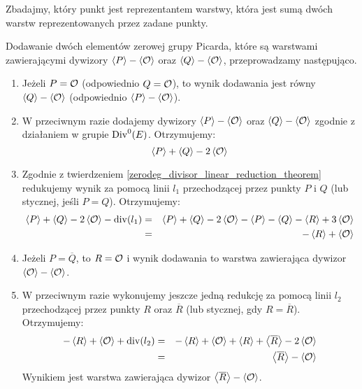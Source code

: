 Zbadajmy, który punkt jest reprezentantem warstwy,
która jest sumą dwóch warstw reprezentowanych przez zadane punkty.

\begin{fact}\label{piczero_addition_fact}
Dodawanie dwóch elementów zerowej grupy Picarda,
które są warstwami zawierającymi dywizory
$\left\langle P\right\rangle - \left\langle\mathcal{O}\right\rangle$ oraz $\left\langle Q\right\rangle - \left\langle\mathcal{O}\right\rangle$,
przeprowadzamy następująco.
\begin{enumerate}
\item
Jeżeli $P = \mathcal{O}$ (odpowiednio $Q = \mathcal{O}$),
to wynik dodawania jest równy
$\left\langle Q\right\rangle - \left\langle\mathcal{O}\right\rangle$ (odpowiednio $\left\langle P\right\rangle - \left\langle\mathcal{O}\right\rangle$).
\item
W przeciwnym razie dodajemy dywizory
$\left\langle P\right\rangle - \left\langle\mathcal{O}\right\rangle$ oraz $\left\langle Q\right\rangle - \left\langle\mathcal{O}\right\rangle$
zgodnie z działaniem w grupie $\operatorname{Div}^0(E)$.
Otrzymujemy:
\begin{equation*}
\left\langle P\right\rangle + \left\langle Q\right\rangle - 2\left\langle\mathcal{O}\right\rangle
\end{equation*}
\item
Zgodnie z twierdzeniem \ref{zerodeg_divisor_linear_reduction_theorem}
redukujemy wynik za pomocą linii $l_1$ przechodzącej przez punkty $P$ i $Q$
(lub stycznej, jeśli $P = Q$).
Otrzymujemy:
\begin{eqnarray*}
\left\langle P\right\rangle + \left\langle Q\right\rangle - 2\left\langle\mathcal{O}\right\rangle - \operatorname{div}(l_1)
& = & \left\langle P\right\rangle + \left\langle Q\right\rangle - 2\left\langle\mathcal{O}\right\rangle
- \left\langle P\right\rangle - \left\langle Q\right\rangle - \left\langle R\right\rangle + 3\left\langle\mathcal{O}\right\rangle
\\ & = &
-\left\langle R\right\rangle + \left\langle\mathcal{O}\right\rangle
\end{eqnarray*}
\item
Jeżeli $P = \overline{Q}$,
to $R = \mathcal{O}$
i wynik dodawania to warstwa
zawierająca dywizor $\left\langle\mathcal{O}\right\rangle - \left\langle\mathcal{O}\right\rangle$.
\item
W przeciwnym razie wykonujemy jeszcze jedną redukcję za pomocą linii $l_2$
przechodzącej przez punkty $R$ oraz $\overline{R}$
(lub stycznej, gdy $R = \overline{R}$).
Otrzymujemy:
\begin{eqnarray*}
-\left\langle R\right\rangle + \left\langle\mathcal{O}\right\rangle + \operatorname{div}(l_2)
& = & -\left\langle R\right\rangle + \left\langle\mathcal{O}\right\rangle
+ \left\langle R\right\rangle + \left\langle\overline{R}\right\rangle - 2\left\langle\mathcal{O}\right\rangle
\\ & = &
\left\langle\overline{R}\right\rangle - \left\langle\mathcal{O}\right\rangle
\end{eqnarray*}
Wynikiem jest warstwa
zawierająca dywizor $\left\langle\overline{R}\right\rangle - \left\langle\mathcal{O}\right\rangle$.
\end{enumerate}
\end{fact}
